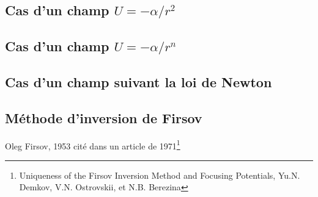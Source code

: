 \subsection{Cas d'un champ $U = -\alpha / r^{2}$}

\subsection{Cas d'un champ $U = -\alpha / r^{n}$}

\subsection{Cas d'un champ suivant la loi de Newton}

\subsection{M\'ethode d'inversion de Firsov}

Oleg Firsov, 1953 cit\'e dans un article de 1971\footnote{Uniqueness of the Firsov Inversion Method and Focusing Potentials, Yu.N. Demkov, V.N. Ostrovskii, et N.B. Berezina}